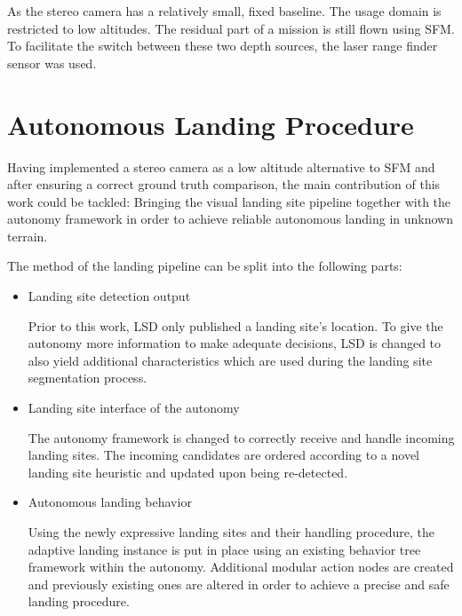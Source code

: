 As the stereo camera has a relatively small, fixed baseline. The usage domain is restricted to low altitudes. The residual part of a mission is still flown using SFM. To facilitate the switch between these two depth sources, the laser range finder sensor was used.

\section{Autonomous Landing Procedure}

Having implemented a stereo camera as a low altitude alternative to SFM and after ensuring a correct ground truth comparison, the main contribution of this work could be tackled: Bringing the visual landing site pipeline together with the autonomy framework in order to achieve reliable autonomous landing in unknown terrain.

The method of the landing pipeline can be split into the following parts:

\begin{itemize}
    \item Landing site detection output

    Prior to this work, LSD only published a landing site's location. To give the autonomy more information to make adequate decisions, LSD is changed to also yield additional characteristics which are used during the landing site segmentation process.
    \item Landing site interface of the autonomy

    The autonomy framework is changed to correctly receive and handle incoming landing sites. The incoming candidates are ordered according to a novel landing site heuristic and updated upon being re-detected.
    \item Autonomous landing behavior

    Using the newly expressive landing sites and their handling procedure, the adaptive landing instance is put in place using an existing behavior tree framework within the autonomy. Additional modular action nodes are created and previously existing ones are altered in order to achieve a precise and safe landing procedure.
\end{itemize}